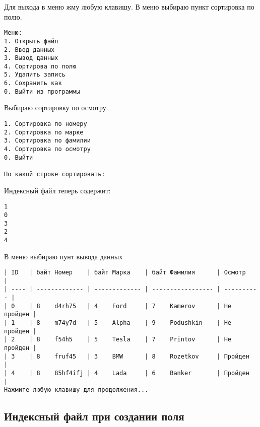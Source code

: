 Для выхода в меню жму любую клавишу. В меню выбираю пункт сортировка по полю.

\begin{tcolorbox}
\begin{verbatim}
Меню:
1. Открыть файл
2. Ввод данных       
3. Вывод данных      
4. Сортирова по полю 
5. Удалить запись    
6. Сохранить как     
0. Выйти из программы
\end{verbatim}
\end{tcolorbox}

Выбираю сортировку по осмотру.

\begin{tcolorbox}
\begin{verbatim}
1. Сортировка по номеру
2. Сортировка по марке       
3. Сортировка по фамилии     
4. Сортировка по осмотру     
0. Выйти

По какой строке сортировать: 
\end{verbatim}
\end{tcolorbox}

Индексный файл теперь содержит:

\begin{tcolorbox}
\begin{verbatim}
1
0
3
2
4
\end{verbatim}
\end{tcolorbox}

В меню выбираю пунт вывода данных

\begin{tcolorbox}
\begin{verbatim}
| ID   | байт Номер    | байт Марка    | байт Фамилия      | Осмотр     | 
| ---- | ------------- | ------------- | ----------------- | ---------- | 
| 0    | 8    d4rh75   | 4    Ford     | 7    Kamerov      | Не пройден | 
| 1    | 8    m74y7d   | 5    Alpha    | 9    Podushkin    | Не пройден | 
| 2    | 8    f54h5    | 5    Tesla    | 7    Printov      | Не пройден | 
| 3    | 8    fruf45   | 3    BMW      | 8    Rozetkov     | Пройден    | 
| 4    | 8    85hf4ifj | 4    Lada     | 6    Banker       | Пройден    | 
Нажмите любую клавишу для продолжения...
\end{verbatim}
\end{tcolorbox}

\newpage

\subsection{Индексный файл при создании поля}

